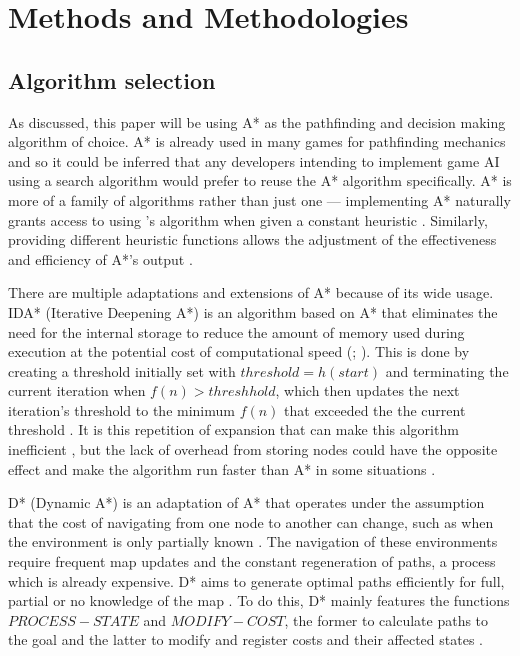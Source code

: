 \documentclass[11pt, a4paper]{report}
\begin{document}
\section{Methods and Methodologies}
\label{sec:methodsAndMethodologies}

\subsection{Algorithm selection}
\label{subsec:algorithmSelection}

As discussed, this paper will be using A* as the pathfinding and decision making algorithm of choice. A* is already used in many games for pathfinding mechanics \parencite[197]{millington2019ai} and so it could be inferred that any developers intending to implement game AI using a search algorithm would prefer to reuse the A* algorithm specifically. A* is more of a family of algorithms rather than just one \parencite[107]{hart1968formal} --- implementing A* naturally grants access to using \citeauthor{dijkstra1959note}'s algorithm \parencite*{dijkstra1959note} when given a constant heuristic \parencite[10]{lester2005pathfinding}. Similarly, providing different heuristic functions allows the adjustment of the effectiveness and efficiency of A*'s output \parencite[107]{hart1968formal}.

There are multiple adaptations and extensions of A* because of its wide usage. IDA* (Iterative Deepening A*) is an algorithm based on A* that eliminates the need for the internal storage \parencite[36]{korf1985depth} to reduce the amount of memory used during execution at the potential cost of computational speed (\cite[2]{botea2004near}; \cite[44]{yap2002grid}). This is done by creating a threshold initially set with $threshold = h(start)$ and terminating the current iteration when $f(n) > threshhold$, which then updates the next iteration's threshold to the minimum $f(n)$ that exceeded the the current threshold \parencite[103]{korf1985depth}. It is this repetition of expansion that can make this algorithm inefficient \parencite[46]{yap2002grid}, but the lack of overhead from storing nodes could have the opposite effect and make the algorithm run faster than A* in some situations \parencite[106]{korf1985depth}.

D* (Dynamic A*) is an adaptation of A* that operates under the assumption that the cost of navigating from one node to another can change, such as when the environment is only partially known \parencite[1-2]{stentz1997optimal}. The navigation of these environments require frequent map updates and the constant regeneration of paths, a process which is already expensive. D* aims to generate optimal paths efficiently for full, partial or no knowledge of the map \parencite[2]{stentz1997optimal}. To do this, D* mainly features the functions $PROCESS-STATE$ and $MODIFY-COST$, the former to calculate paths to the goal and the latter to modify and register costs and their affected states \parencite[3]{stentz1997optimal}.
\end{document}

